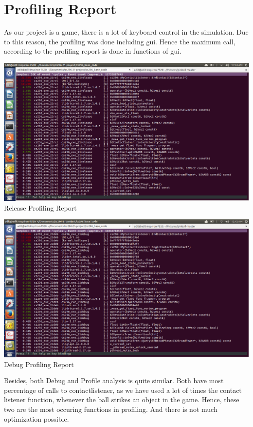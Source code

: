 \documentclass[11pt]{article}
\begin{document}
\section{Profiling Report}
As our project is a game, there is a lot of keyboard control in the simulation. Due to this reason, the profiling was done including gui. Hence the maximum call, according to the profiling report is done in functions of gui.
\begin{center}
\includegraphics[scale=0.5]{../plots/release.png}\\
Release Profiling Report
\end{center}
\begin{center}
\includegraphics[scale=0.5]{../plots/debug.png}\\
Debug Profiling Report
\end{center}
Besides, both Debug and Profile analysis is quite similar. Both have most percentage of calls to contactlistener, as we have used a lot of times the contact listener function, whenever the ball strikes an object in the game. Hence, these two are the most occuring functions in profiling. And there is not much optimization possible.
\end{document}
